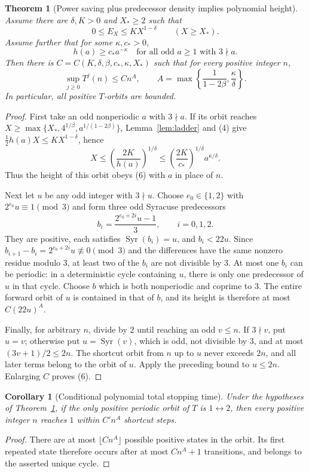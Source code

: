 \documentclass[11pt]{amsart}
\newtheorem{theorem}{Theorem}
\newtheorem{corollary}{Corollary}
\theoremstyle{remark}
\newcommand{\Syr}{\operatorname{Syr}}
\begin{document}
\begin{theorem}[Power saving plus predecessor density implies polynomial height]
\label{thm:height}
Assume there are $\delta,K>0$ and $X_*\ge2$ such that
\[
0\le E_X\le K X^{1-\delta}\qquad(X\ge X_*).\tag{4}
\]
Assume further that for some $\kappa,c_*>0$,
\[
h(a)\ge c_*a^{-\kappa}\quad
\text{for all odd }a\ge1\text{ with }3\nmid a.\tag{5}
\]
Then there is $C=C(K,\delta,\beta,c_*,\kappa,X_*)$ such that
for every positive integer $n$,
\[
\boxed{\sup_{j\ge0}T^j(n)\le C n^A,\qquad
A=\max\left\{\frac1{1-2\beta},\frac\kappa\delta\right\}.}\tag{6}
\]
In particular, all positive $T$-orbits are bounded.
\end{theorem}
\begin{proof}
First take an odd nonperiodic $a$ with $3\nmid a$.
If its orbit reaches
$X\ge\max\{X_*,4^{1/\beta},a^{1/(1-2\beta)}\}$,
Lemma~\ref{lem:ladder} and (4) give
$\frac12h(a)X\le K X^{1-\delta}$, hence
\[
X\le\left(\frac{2K}{h(a)}\right)^{1/\delta}
\le\left(\frac{2K}{c_*}\right)^{1/\delta}a^{\kappa/\delta}.
\]
Thus the height of this orbit obeys (6) with $a$ in place of $n$.

Next let $u$ be any odd integer with $3\nmid u$. Choose
$e_0\in\{1,2\}$ with $2^{e_0}u\equiv1\pmod3$ and form three odd
Syracuse predecessors
\[
b_i=\frac{2^{e_0+2i}u-1}{3},\qquad i=0,1,2.
\]
They are positive, each satisfies $\Syr(b_i)=u$, and $b_i<22u$.
Since $b_{i+1}-b_i=2^{e_0+2i}u\not\equiv0\pmod3$ and the differences
have the same nonzero residue modulo $3$, at least two of the $b_i$
are not divisible by $3$. At most one $b_i$ can be periodic: in a
deterministic cycle containing $u$, there is only one predecessor of
$u$ in that cycle. Choose $b$ which is both nonperiodic and
coprime to $3$. The entire forward orbit of $u$ is contained in that
of $b$, and its height is therefore at most $C(22u)^A$.

Finally, for arbitrary $n$, divide by $2$ until reaching an odd $v\le n$.
If $3\nmid v$, put $u=v$; otherwise put $u=\Syr(v)$, which is odd,
not divisible by $3$, and at most $(3v+1)/2\le2n$. The shortcut
orbit from $n$ up to $u$ never exceeds $2n$, and all later terms
belong to the orbit of $u$. Apply the preceding bound to $u\le2n$.
Enlarging $C$ proves (6).
\end{proof}

\begin{corollary}[Conditional polynomial total stopping time]
Under the hypotheses of Theorem~\ref{thm:height}, if the only
positive periodic orbit of $T$ is $1\leftrightarrow2$, then every
positive integer $n$ reaches $1$ within $C' n^A$ shortcut steps.
\end{corollary}
\begin{proof}
There are at most $\lfloor Cn^A\rfloor$ possible positive states in
the orbit. Its first repeated state therefore occurs after at most
$Cn^A+1$ transitions, and belongs to the asserted unique cycle.
\end{proof}
\end{document}
